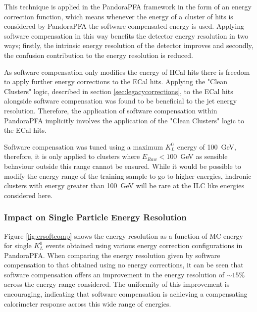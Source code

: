 This technique is applied in the PandoraPFA framework in the form of an energy correction function, which means whenever the energy of a cluster of hits is considered by PandoraPFA the software compensated energy is used.  Applying software compensation in this way benefits the detector energy resolution in two ways; firstly, the intrinsic energy resolution of the detector improves and secondly, the confusion contribution to the energy resolution is reduced.

As software compensation only modifies the energy of HCal hits there is freedom to apply further energy corrections to the ECal hits.  Applying the "Clean Clusters" logic, described in section \ref{sec:legacycorrections}, to the ECal hits alongside software compensation was found to be beneficial to the jet energy resolution.  Therefore, the application of software compensation within PandoraPFA implicitly involves the application of the "Clean Clusters" logic to the ECal hits.  

Software compensation was tuned using a maximum $K^{0}_{L}$ energy of 100~GeV, therefore, it is only applied to clusters where $E_{Raw} < 100$~GeV as sensible behaviour outside this range cannot be ensured.  While it would be possible to modify the energy range of the training sample to go to higher energies, hadronic clusters with energy greater than 100~GeV will be rare at the ILC like energies considered here.


\subsubsection{Impact on Single Particle Energy Resolution}
\label{sec:softcomper}
Figure \ref{fig:ersoftcomp} shows the energy resolution as a function of MC energy for single $K^{0}_{L}$ events obtained using various energy correction configurations in PandoraPFA.  When comparing the energy resolution given by software compensation to that obtained using no energy corrections, it can be seen that software compensation offers an improvement in the energy resolution of $\sim 15 \%$ across the energy range considered.  The uniformity of this improvement is encouraging, indicating that software compensation is achieving a compensating calorimeter response across this wide range of energies.  

